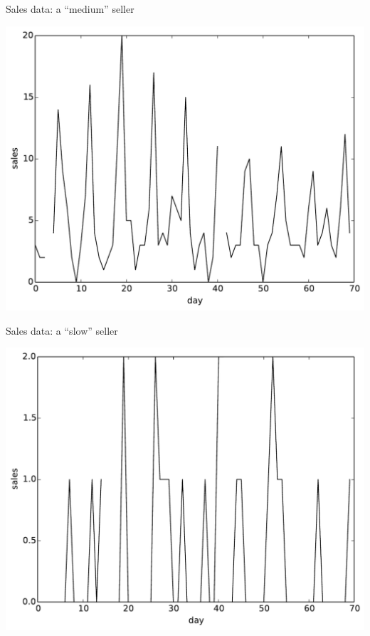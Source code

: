 \documentclass{beamer}
\begin{document}
\begin{frame}{Sales data: a ``medium'' seller}
 \begin{center}
  \includegraphics[width=0.8\columnwidth]{medium_seller.pdf}
 \end{center}
\end{frame}

\begin{frame}{Sales data: a ``slow'' seller}
  \begin{center}
  \includegraphics[width=0.8\columnwidth]{slow_seller.pdf}
 \end{center}
\end{frame}
\end{document}
